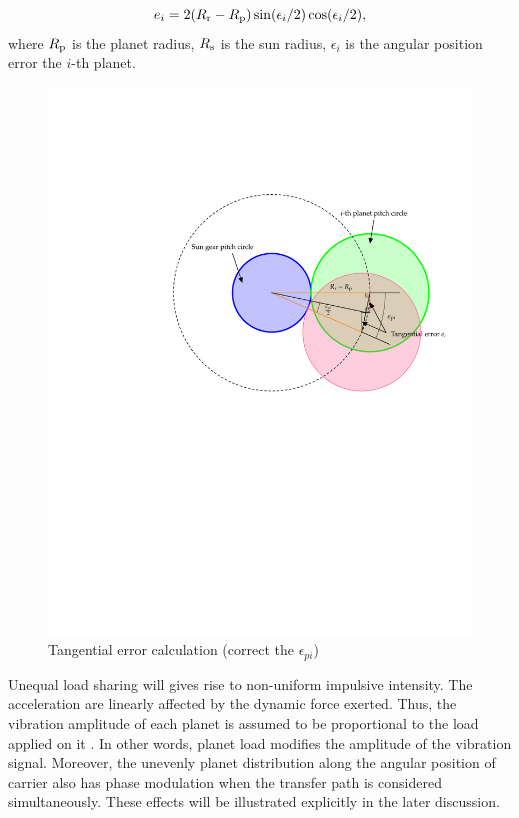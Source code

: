 \documentclass[a4paper,fleqn]{cas-sc}%
\begin{document}
\begin{equation}
    e_{i}=2(R_{\rm r}-R_{\rm p})\sin(\epsilon_{i}/2)\cos(\epsilon_{i}/2),\label{eq:tangential_error}
\end{equation}
where $R_{\rm p}$ is the planet radius, $R_{\rm s}$ is the sun radius, $\epsilon_{i}$ is the angular position error the $i$-th planet.
\begin{figure}[pos=htbp]
    \centering
    \includegraphics[scale=0.5]{tangential_error.pdf}
    \caption{Tangential error calculation (correct the $\epsilon_{pi}$)}
    \label{fig:tangential_error}
\end{figure}
\par Unequal load sharing will gives rise to non-uniform impulsive intensity. The acceleration are linearly affected by the dynamic force exerted. Thus, the vibration amplitude of each planet is assumed to be proportional to the load applied on it \cite{Inalpolat2009}. In other words, planet load modifies the amplitude of the vibration signal. Moreover, the unevenly planet distribution along the angular position of carrier also has phase modulation when the transfer path is considered simultaneously. These effects will be illustrated explicitly in the later discussion. 
\end{document}
